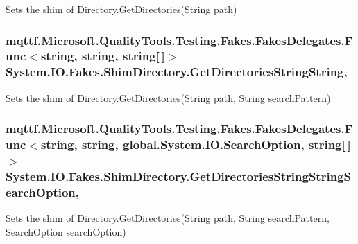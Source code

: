 Sets the shim of Directory.\-Get\-Directories(\-String path)

\hypertarget{class_system_1_1_i_o_1_1_fakes_1_1_shim_directory_ad3882a77d36a485e3fd66d9fc746f730}{
\subsubsection[{Get\-Directories\-String\-String}]{\setlength{\rightskip}{0pt plus 5cm}mqttf.\-Microsoft.\-Quality\-Tools.\-Testing.\-Fakes.\-Fakes\-Delegates.\-Func$<$string, string, string\mbox{[}$\,$\mbox{]}$>$ System.\-I\-O.\-Fakes.\-Shim\-Directory.\-Get\-Directories\-String\-String\hspace{0.3cm}{\ttfamily [static]}, {\ttfamily [set]}}}\label{class_system_1_1_i_o_1_1_fakes_1_1_shim_directory_ad3882a77d36a485e3fd66d9fc746f730}


Sets the shim of Directory.\-Get\-Directories(\-String path, String search\-Pattern)

\hypertarget{class_system_1_1_i_o_1_1_fakes_1_1_shim_directory_a5fe1b27363530b324751f92995ac2eab}{
\subsubsection[{Get\-Directories\-String\-String\-Search\-Option}]{\setlength{\rightskip}{0pt plus 5cm}mqttf.\-Microsoft.\-Quality\-Tools.\-Testing.\-Fakes.\-Fakes\-Delegates.\-Func$<$string, string, global.\-System.\-I\-O.\-Search\-Option, string\mbox{[}$\,$\mbox{]}$>$ System.\-I\-O.\-Fakes.\-Shim\-Directory.\-Get\-Directories\-String\-String\-Search\-Option\hspace{0.3cm}{\ttfamily [static]}, {\ttfamily [set]}}}\label{class_system_1_1_i_o_1_1_fakes_1_1_shim_directory_a5fe1b27363530b324751f92995ac2eab}


Sets the shim of Directory.\-Get\-Directories(\-String path, String search\-Pattern, Search\-Option search\-Option)


